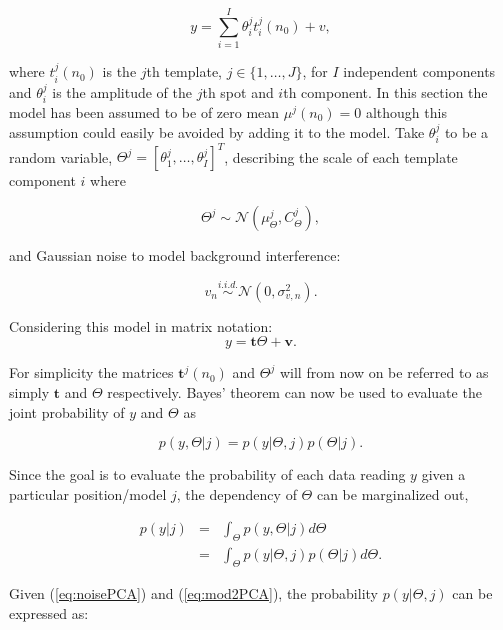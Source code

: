 \begin{equation}\label{eq:mod1}
y = \sum_{i=1}^{I} \theta_i^j t_i^j(n_0) + v,
\end{equation}

where $t_i^j(n_0)$ is the $j$th template, $j \in \{1, \ldots ,J\}$, for $I$ independent components and $\theta_i^j$ is the amplitude of the $j$th spot and $i$th component. In this section the model has been assumed to be of zero mean $\mu^j(n_0) =0$ although this assumption could easily be avoided by adding it to the model. Take $\theta_i^j$ to be a random variable, $\Theta^j = [\theta_1^j,\ldots,\theta_I^j]^T$, describing the scale of each template component $i$ where

\begin{equation}\label{eq:theta}
\Theta^j \sim \mathcal{N}(\mu_{\Theta}^j,C_{\Theta}^j),
\end{equation}

and Gaussian noise to model background interference:

\begin{equation}\label{eq:noisePCA}
v_n \stackrel{i.i.d.}{\sim} \mathcal{N}(0,\sigma_{v,n}^2).
\end{equation}

Considering this model in matrix notation:
\begin{equation}\label{eq:mod2PCA}
y = \textbf{t}\Theta + \textbf{v}.
\end{equation}

For simplicity the matrices $\textbf{t}^j(n_0)$ and $\Theta^j$ will from now on be referred to as simply $\textbf{t}$ and $\Theta$ respectively.
Bayes' theorem can now be used to evaluate the joint probability of $y$ and $\Theta$ as

\begin{equation}\label{eq:bayes1}
p(y,\Theta | j) = p(y|\Theta,j)p(\Theta | j).
\end{equation}

Since the goal is to evaluate the probability of each data reading $y$ given a particular position/model $j$, the dependency of $\Theta$ can be marginalized out,

\begin{eqnarray}\nonumber
p(y|j) &=& \int_\Theta p(y,\Theta|j) d\Theta \\
\label{eq:marg1} &=& \int_\Theta p(y|\Theta,j)p(\Theta|j) d\Theta.
\end{eqnarray}

Given (\ref{eq:noisePCA}) and (\ref{eq:mod2PCA}), the probability $p(y|\Theta,j)$ can be expressed as:

